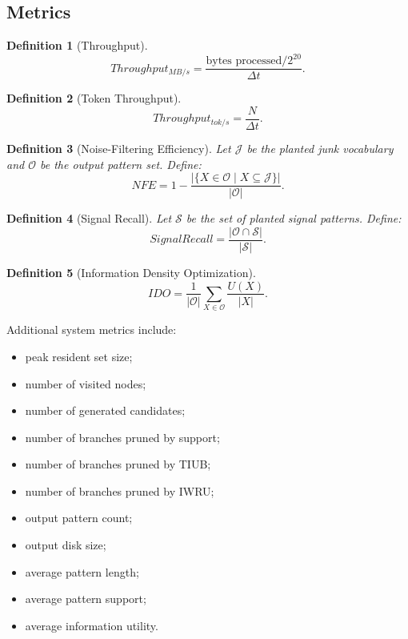 \documentclass[11pt,a4paper]{article}
\newtheorem{definition}{Definition}
\newcommand{\Output}{\mathcal{O}}
\newcommand{\Signal}{\mathcal{S}}
\newcommand{\Junk}{\mathcal{J}}
\begin{document}
\subsection{Metrics}

\begin{definition}[Throughput]
\[
Throughput_{MB/s}
=
\frac{\text{bytes processed}/2^{20}}{\Delta t}.
\]
\end{definition}

\begin{definition}[Token Throughput]
\[
Throughput_{tok/s}
=
\frac{N}{\Delta t}.
\]
\end{definition}

\begin{definition}[Noise-Filtering Efficiency]
Let \(\Junk\) be the planted junk vocabulary and \(\Output\) be the output pattern set. Define:
\[
NFE=
1-
\frac{
|\{X\in\Output\mid X\subseteq\Junk\}|
}{
|\Output|
}.
\]
\end{definition}

\begin{definition}[Signal Recall]
Let \(\Signal\) be the set of planted signal patterns. Define:
\[
SignalRecall=
\frac{|\Output\cap\Signal|}{|\Signal|}.
\]
\end{definition}

\begin{definition}[Information Density Optimization]
\[
IDO=
\frac{1}{|\Output|}
\sum_{X\in\Output}
\frac{U(X)}{|X|}.
\]
\end{definition}

Additional system metrics include:

\begin{itemize}
    \item peak resident set size;
    \item number of visited nodes;
    \item number of generated candidates;
    \item number of branches pruned by support;
    \item number of branches pruned by TIUB;
    \item number of branches pruned by IWRU;
    \item output pattern count;
    \item output disk size;
    \item average pattern length;
    \item average pattern support;
    \item average information utility.
\end{itemize}
\end{document}
